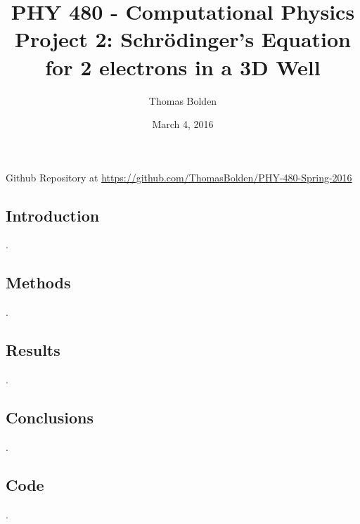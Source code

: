 \documentclass[11pt]{article}
\title{PHY 480 - Computational Physics \\ Project 2: Schr\"{o}dinger's Equation for 2 electrons in a 3D Well}
\author{Thomas Bolden}
\date{March 4, 2016}
\begin{document}
\maketitle

\centerline{Github Repository at \href{https://github.com/ThomasBolden/PHY-480-Spring-2016}{https://github.com/ThomasBolden/PHY-480-Spring-2016}}

\begin{abstract}
\lipsum[1-1]
\end{abstract}

\vfill

\tableofcontents

\vspace{3cm}

\pagebreak

\subsection{Introduction}

    .

\subsection{Methods}

    .

\subsection{Results}

    .

\subsection{Conclusions}

    .

\subsection{Code}

    .
\end{document}
